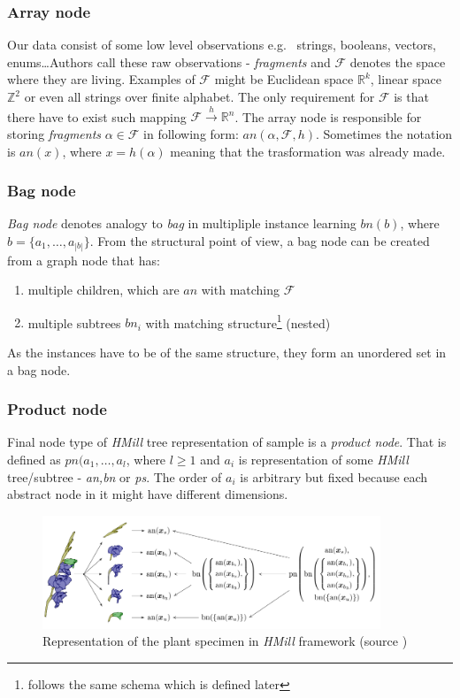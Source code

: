 \subsubsection{Array node}
Our data consist of some low level observations e.g. \ strings, booleans, vectors, enums\dots Authors call these raw observations - \emph{fragments} and $\mathcal{F}$ denotes the space where they are living. Examples of $\mathcal{F}$ might be Euclidean space $\mathbb{R}^{k}$, linear space $\mathbb{Z}^{2}$ or even all strings over finite alphabet. The only requirement for $\mathcal{F}$ is that there have to exist such mapping $\mathcal{F}\xrightarrow{h}\mathbb{R}^{n}$. The array node is responsible for storing \emph{fragments} $\alpha\in\mathcal{F}$ in following form: $an(\alpha,\mathcal{F},h)$. Sometimes the notation is $an(x)$, where $x=h(\alpha)$ meaning that the trasformation was already made.

\subsubsection{Bag node}
\emph{Bag node} denotes analogy to \emph{bag} in multipliple instance learning $bn(b)$, where $b=\{a_1,\dots,a_{|b|}\}$. 
From the structural point of view, a bag node can be created from a graph node that has:
\begin{enumerate}
    \itemsep0em 
	\item multiple children, which are $an$ with matching $\mathcal{F}$
	\item multiple subtrees $bn_i$ with matching structure\footnote{follows the same schema which is defined later} (nested)
\end{enumerate}
As the instances have to be of the same structure, they form an unordered set in a bag node.

\subsubsection{Product node}
Final node type of \emph{HMill} tree representation of sample is a \emph{product node}. That is defined as $pn(a_1,\dots,a_{l}$, where $l\geq1$ and $a_i$ is representation of some \emph{HMill} tree/subtree - \emph{an,bn} or \emph{ps}. The order of $a_i$ is arbitrary but fixed because each abstract node in it might have different dimensions.

\begin{figure}[h]
    \centering
    \includegraphics[width=0.9\textwidth]{figures/irismill.png}
    \caption{Representation of the plant specimen in \emph{HMill} framework (source \cite{Mandlik2020})}
    \label{fig:irismill}
\end{figure}

